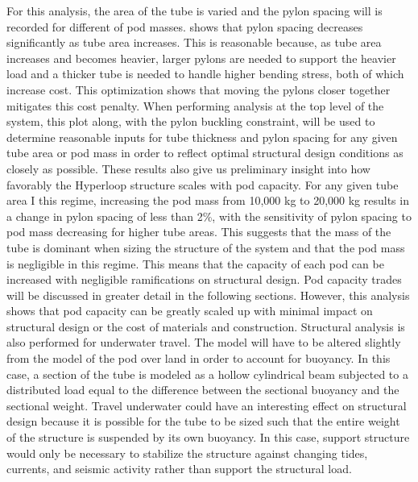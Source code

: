 For this analysis, the area of the tube is varied and the pylon spacing will is recorded for different of pod masses.  shows that pylon spacing decreases significantly as tube area increases. This is reasonable because, as tube area increases and becomes heavier, larger pylons are needed to support the heavier load and a thicker tube is needed to handle higher bending stress, both of which increase cost. This optimization shows that moving the pylons closer together mitigates this cost penalty. When performing analysis at the top level of the system, this plot along, with the pylon buckling constraint, will be used to determine reasonable inputs for tube thickness and pylon spacing for any given tube area or pod mass in order to reflect optimal structural design conditions as closely as possible.
These results also give us preliminary insight into how favorably the Hyperloop structure scales with pod capacity. For any given tube area I this regime, increasing the pod mass from 10,000 kg to 20,000 kg results in a change in pylon spacing of less than 2\%, with the sensitivity of pylon spacing to pod mass decreasing for higher tube areas. This suggests that the mass of the tube is dominant when sizing the structure of the system and that the pod mass is negligible in this regime. This means that the capacity of each pod can be increased with negligible ramifications on structural design. Pod capacity trades will be discussed in greater detail in the following sections. However, this analysis shows that pod capacity can be greatly scaled up with minimal impact on structural design or the cost of materials and construction.
Structural analysis is also performed for underwater travel. The model will have to be altered slightly from the model of the pod over land in order to account for buoyancy. In this case, a section of the tube is modeled as a hollow cylindrical beam subjected to a distributed load equal to the difference between the sectional buoyancy and the sectional weight. Travel underwater could have an interesting effect on structural design because it is possible for the tube to be sized such that the entire weight of the structure is suspended by its own buoyancy. In this case, support structure would only be necessary to stabilize the structure against changing tides, currents, and seismic activity rather than support the structural load.

